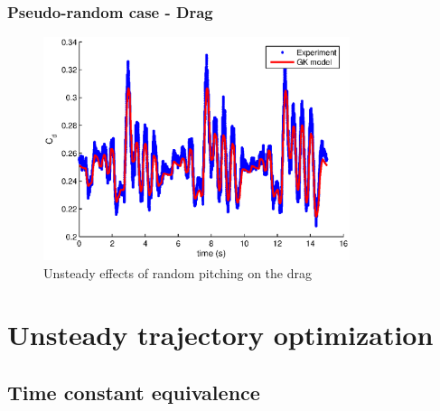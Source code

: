 \documentclass[compress]{beamer}
\begin{document}
\begin{frame}
  \frametitle{Pseudo-random case - Drag}
  \begin{figure}[h]
    \begin{center}
      \includegraphics[width=0.8\textwidth]{./Figures/Cd_u=3_meanaoa=12(15seconds)_amp=2_freq=2p0.eps}
    \end{center}
    \caption{Unsteady effects of random pitching on the drag}
  \end{figure}
\end{frame}

\section[Unsteady optimization]{Unsteady trajectory optimization}

\subsection{Time constant equivalence}
\end{document}
